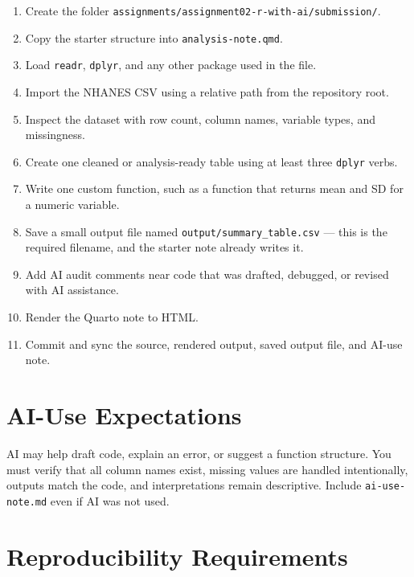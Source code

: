 \documentclass[
  letterpaper,
  DIV=11,
  numbers=noendperiod,
  oneside]{scrreprt}
\providecommand{\tightlist}{%
  \setlength{\itemsep}{0pt}\setlength{\parskip}{0pt}}
\begin{document}
\begin{enumerate}
\def\labelenumi{\arabic{enumi}.}
\tightlist
\item
  Create the folder
  \texttt{assignments/assignment02-r-with-ai/submission/}.
\item
  Copy the starter structure into \texttt{analysis-note.qmd}.
\item
  Load \texttt{readr}, \texttt{dplyr}, and any other package used in the
  file.
\item
  Import the NHANES CSV using a relative path from the repository root.
\item
  Inspect the dataset with row count, column names, variable types, and
  missingness.
\item
  Create one cleaned or analysis-ready table using at least three
  \texttt{dplyr} verbs.
\item
  Write one custom function, such as a function that returns mean and SD
  for a numeric variable.
\item
  Save a small output file named \texttt{output/summary\_table.csv} ---
  this is the required filename, and the starter note already writes it.
\item
  Add AI audit comments near code that was drafted, debugged, or revised
  with AI assistance.
\item
  Render the Quarto note to HTML.
\item
  Commit and sync the source, rendered output, saved output file, and
  AI-use note.
\end{enumerate}

\section{AI-Use Expectations}\label{ai-use-expectations-1}

AI may help draft code, explain an error, or suggest a function
structure. You must verify that all column names exist, missing values
are handled intentionally, outputs match the code, and interpretations
remain descriptive. Include \texttt{ai-use-note.md} even if AI was not
used.

\section{Reproducibility
Requirements}\label{reproducibility-requirements-1}
\end{document}
